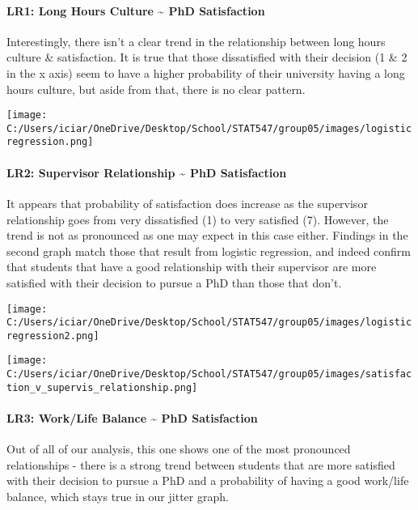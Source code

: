 \documentclass[
]{article}
\begin{document}
\hypertarget{lr1-long-hours-culture-phd-satisfaction}{%
\paragraph{LR1: Long Hours Culture \textasciitilde{} PhD
Satisfaction}\label{lr1-long-hours-culture-phd-satisfaction}}

Interestingly, there isn't a clear trend in the relationship between
long hours culture \& satisfaction. It is true that those dissatisfied
with their decision (1 \& 2 in the x axis) seem to have a higher
probability of their university having a long hours culture, but aside
from that, there is no clear pattern.

\texttt{[image: C:/Users/iciar/OneDrive/Desktop/School/STAT547/group05/images/logisticregression.png]}

\hypertarget{lr2-supervisor-relationship-phd-satisfaction}{%
\paragraph{LR2: Supervisor Relationship \textasciitilde{} PhD
Satisfaction}\label{lr2-supervisor-relationship-phd-satisfaction}}

It appears that probability of satisfaction does increase as the
supervisor relationship goes from very dissatisfied (1) to very
satisfied (7). However, the trend is not as pronounced as one may expect
in this case either. Findings in the second graph match those that
result from logistic regression, and indeed confirm that students that
have a good relationship with their supervisor are more satisfied with
their decision to pursue a PhD than those that don't.

\texttt{[image: C:/Users/iciar/OneDrive/Desktop/School/STAT547/group05/images/logisticregression2.png]}

\texttt{[image: C:/Users/iciar/OneDrive/Desktop/School/STAT547/group05/images/satisfaction\_v\_supervis\_relationship.png]}

\hypertarget{lr3-worklife-balance-phd-satisfaction}{%
\paragraph{LR3: Work/Life Balance \textasciitilde{} PhD
Satisfaction}\label{lr3-worklife-balance-phd-satisfaction}}

Out of all of our analysis, this one shows one of the most pronounced
relationships - there is a strong trend between students that are more
satisfied with their decision to pursue a PhD and a probability of
having a good work/life balance, which stays true in our jitter graph.
\end{document}
